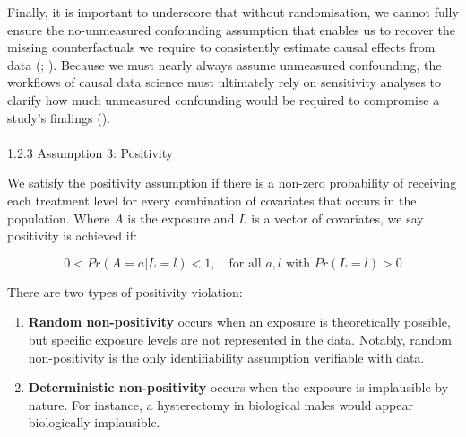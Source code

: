 \documentclass[
  singlecolumn]{article}
\makeatletter
\let\oldparagraph\paragraph
\renewcommand{\paragraph}{
    \@ifstar
      \xxxParagraphStar
      \xxxParagraphNoStar
  }
\newcommand{\xxxParagraphStar}[1]{\oldparagraph*{#1}\mbox{}}
\newcommand{\xxxParagraphNoStar}[1]{\oldparagraph{#1}\mbox{}}
\makeatother
\begin{document}
Finally, it is important to underscore that without randomisation, we
cannot fully ensure the no-unmeasured confounding assumption that
enables us to recover the missing counterfactuals we require to
consistently estimate causal effects from data
(;
). Because we must
nearly always assume unmeasured confounding, the workflows of causal
data science must ultimately rely on sensitivity analyses to clarify how
much unmeasured confounding would be required to compromise a study's
findings ().

\paragraph{1.2.3 Assumption 3:
Positivity}\label{assumption-3-positivity}

We satisfy the positivity assumption if there is a non-zero probability
of receiving each treatment level for every combination of covariates
that occurs in the population. Where \(A\) is the exposure and \(L\) is
a vector of covariates, we say positivity is achieved if:

\[
0 < Pr(A = a | L = l) < 1, \quad \text{for all } a, l \text{ with } Pr(L = l) > 0
\]

There are two types of positivity violation:

\begin{enumerate}
\def\labelenumi{\arabic{enumi}.}
\item
  \textbf{Random non-positivity} occurs when an exposure is
  theoretically possible, but specific exposure levels are not
  represented in the data. Notably, random non-positivity is the only
  identifiability assumption verifiable with data.
\item
  \textbf{Deterministic non-positivity} occurs when the exposure is
  implausible by nature. For instance, a hysterectomy in biological
  males would appear biologically implausible.
\end{enumerate}
\end{document}
